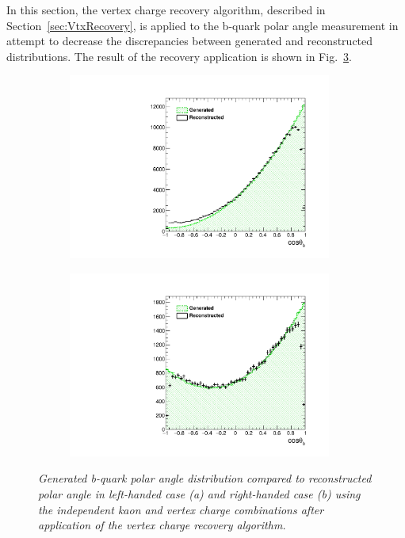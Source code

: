 In this section, the vertex charge recovery algorithm, described in Section~\ref{sec:VtxRecovery}, is applied to the b-quark polar angle measurement in attempt to decrease the discrepancies between generated and reconstructed distributions.
The result of the recovery application is shown in Fig.~\ref{fig:BAsymmetryRec_3}.
\begin{figure}
	\centering
	\begin{subfigure}{0.5\textwidth}
		\includegraphics[width=0.95\textwidth]{ILD/plots/basymmetry-rec-nocorr-nobkg-left.pdf}
		\caption{\label{fig:BAsymmetryRec_a_3} }
	\end{subfigure}%
	\begin{subfigure}{0.5\textwidth}
		\centering
		\includegraphics[width=0.95\textwidth]{ILD/plots/basymmetry-rec-nocorr-nobkg-right.pdf}
		\caption{\label{fig:BAsymmetryRec_b_3} }
	\end{subfigure}
	\caption{\sl Generated b-quark polar angle distribution compared to reconstructed polar angle in left-handed case (a) and right-handed case (b) using the independent kaon and vertex charge combinations after application of the vertex charge recovery algorithm. }
	\label{fig:BAsymmetryRec_3}
\end{figure}
